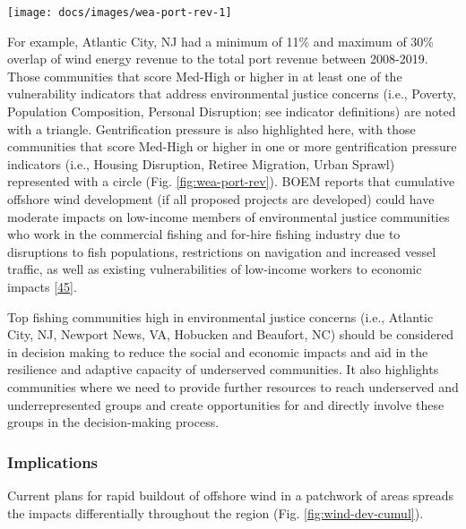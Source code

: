 \documentclass[
  10pt,
]{article}
\let\origfigure\figure
\let\endorigfigure\endfigure
\renewenvironment{figure}[1][2] {
    \expandafter\origfigure\expandafter[H]
} {
    \endorigfigure
}
\begin{document}
\begin{figure}

\texttt{[image: docs/images/wea-port-rev-1]} \hfill{}

\caption{Percent of port revenue from Wind Energy Areas (WEA) in descending order from most to least port revenue from WEA.}\label{fig:wea-port-rev}
\end{figure}

For example, Atlantic City, NJ had a minimum of 11\% and maximum of 30\%
overlap of wind energy revenue to the total port revenue between
2008-2019. Those communities that score Med-High or higher in at least
one of the vulnerability indicators that address environmental justice
concerns (i.e., Poverty, Population Composition, Personal Disruption;
see indicator definitions) are noted with a triangle. Gentrification
pressure is also highlighted here, with those communities that score
Med-High or higher in one or more gentrification pressure indicators
(i.e., Housing Disruption, Retiree Migration, Urban Sprawl) represented
with a circle (Fig. \ref{fig:wea-port-rev}). BOEM reports that
cumulative offshore wind development (if all proposed projects are
developed) could have moderate impacts on low-income members of
environmental justice communities who work in the commercial fishing and
for-hire fishing industry due to disruptions to fish populations,
restrictions on navigation and increased vessel traffic, as well as
existing vulnerabilities of low-income workers to economic impacts
{[}\protect\hyperlink{ref-boem_vineyard_2020}{45}{]}.

Top fishing communities high in environmental justice concerns (i.e.,
Atlantic City, NJ, Newport News, VA, Hobucken and Beaufort, NC) should
be considered in decision making to reduce the social and economic
impacts and aid in the resilience and adaptive capacity of underserved
communities. It also highlights communities where we need to provide
further resources to reach underserved and underrepresented groups and
create opportunities for and directly involve these groups in the
decision-making process.

\hypertarget{implications-7}{%
\subsubsection{Implications}\label{implications-7}}

Current plans for rapid buildout of offshore wind in a patchwork of
areas spreads the impacts differentially throughout the region (Fig.
\ref{fig:wind-dev-cumul}).
\end{document}
